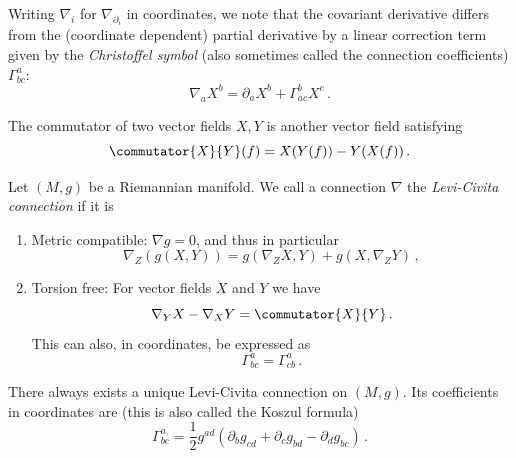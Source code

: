 \documentclass[titlepage,numbers=noenddot,oneside,%
cleardoublepage=empty,paper=a4,fontsize=11pt,%
english,%
]{scrartcl}
\newcommand*{\mathcomma}{\,,}
\newcommand*{\mathfullstop}{\,.}
\begin{document}
\begin{remark}
    Writing \( \nabla_i \) for \( \nabla_{\partial_i} \) in coordinates, we note that the covariant derivative differs from the (coordinate dependent) partial derivative by a linear correction term given by the \emph{Christoffel symbol} (also sometimes called the connection coefficients) \( \Gamma^a_{b c} \):
    \begin{equation*}
        \nabla_{a} X^b = \partial_a X^b+\Gamma_{ac}^b X^c\mathfullstop
    \end{equation*}
\end{remark}
\begin{recall}
    The commutator of two vector fields \( X,Y \) is another vector field satisfying
    \begin{equation*}
        \commutator{X}{Y}(f)=X(Y(f))-Y(X(f))\mathfullstop
    \end{equation*}
\end{recall}
\begin{theorem}
    Let \( (M,g) \) be a Riemannian manifold. We call a connection \( \nabla \) the \emph{Levi-Civita connection} if it is
    \begin{enumerate}
        \item Metric compatible: \( \nabla g=0 \), and thus in particular
        \begin{equation*}
            \nabla_Z (g(X,Y))=g(\nabla_Z X, Y)+g(X,\nabla_Z Y)\mathcomma
        \end{equation*}
        \item Torsion free: For vector fields \( X \) and \( Y \) we have
        \begin{equation*}
            \nabla_Y X-\nabla_X Y=\commutator{X}{Y}\mathfullstop
        \end{equation*}
        This can also, in coordinates, be expressed as
        \begin{equation*}
            \Gamma^{a}_{bc} = \Gamma^a_{cb}\mathfullstop
        \end{equation*}
    \end{enumerate}
    There always exists a unique Levi-Civita connection on \( (M,g) \). Its coefficients in coordinates are (this is also called the Koszul formula)
    \begin{equation}
        \Gamma^a_{bc}=\frac{1}{2}g^{ad}(\partial_b g_{cd}+\partial_c g_{bd}-\partial_d g_{bc})\mathfullstop\label{eq:koszul_formula}
    \end{equation}
\end{theorem}
\end{document}
